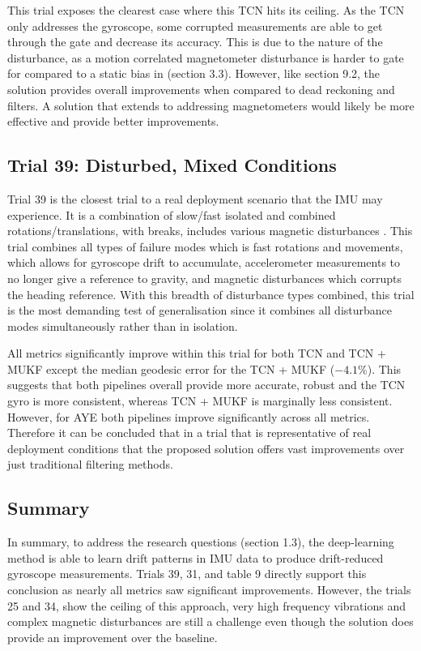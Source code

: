 This trial exposes the clearest case where this TCN hits its ceiling. As the TCN only addresses the gyroscope, some corrupted measurements are able to get through the gate and decrease its accuracy. 
This is due to the nature of the disturbance, as a motion correlated magnetometer disturbance is harder to gate for compared to a static bias in (section 3.3). However,
like section 9.2, the solution provides overall improvements when compared to dead reckoning and filters. A solution that extends to addressing magnetometers would likely be more effective and provide
better improvements.

\subsection{Trial 39: Disturbed, Mixed Conditions}

Trial 39 is the closest trial to a real deployment scenario that the IMU may experience. It is a combination of slow/fast 
isolated and combined rotations/translations, with breaks, includes various magnetic disturbances \cite{laidig_2021_broada}. This
trial combines all types of failure modes which is fast rotations and movements, which allows for gyroscope drift to accumulate, accelerometer
measurements to no longer give a reference to gravity, and magnetic disturbances which corrupts the heading reference. With this breadth of 
disturbance types combined, this trial is the most demanding test of generalisation since it combines all disturbance modes simultaneously rather than in isolation.

All metrics significantly improve within this trial for both TCN and TCN + MUKF except the median geodesic error for the TCN + MUKF ($-4.1\%$). 
This suggests that both pipelines overall provide more accurate, robust and the TCN gyro is more consistent, whereas TCN + MUKF is marginally
less consistent. However, for AYE both pipelines improve significantly across all metrics. Therefore it can be concluded that in a trial that is 
representative of real deployment conditions that the proposed solution offers vast improvements over just traditional filtering methods.

\subsection{Summary}
In summary, to address the research questions (section 1.3), the deep-learning method is able to learn drift patterns in IMU data to
produce drift-reduced gyroscope measurements. Trials 39, 31, and  table 9 
directly support this conclusion as nearly all metrics saw significant improvements. However, the trials 25 and 34, show the ceiling 
of this approach, very high frequency vibrations and complex magnetic disturbances are still a challenge even though the solution does provide an 
improvement over the baseline. 

